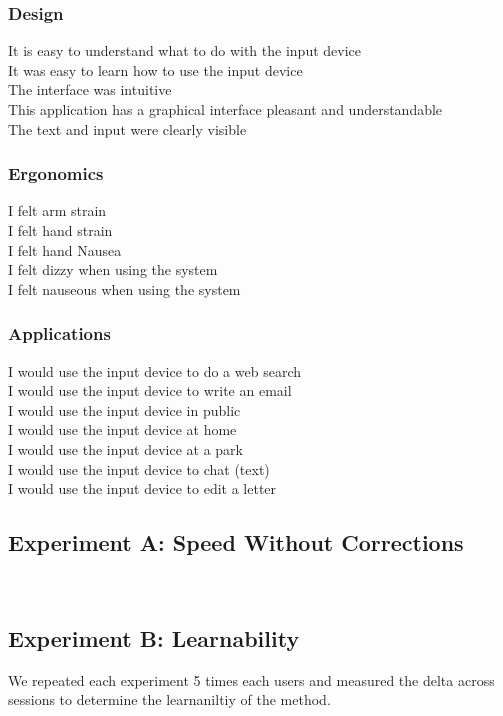 \documentclass{sigchi}
\begin{document}
\subsubsection{Design}
It is easy to understand what to do with the input device\\
It was easy to learn how to use the input device\\
The interface was intuitive\\
This application has a graphical interface pleasant and understandable\\
The text and input were clearly visible

\subsubsection{Ergonomics}
I felt arm strain\\
I felt hand strain\\
I felt hand Nausea\\
I felt dizzy when using the system\\
I felt nauseous when using the system

\subsubsection{Applications}
I would use the input device to do a web search\\
I would use the input device to write an email\\
I would use the input device in public\\
I would use the input device at home\\
I would use the input device at a park\\
I would use the input device to chat (text)\\
I would use the input device to edit a letter

\subsection{Experiment A: Speed Without Corrections}
~\cite{william1995theoretical}

\subsection{Experiment B: Learnability}
We repeated each experiment 5 times each users and measured the delta across sessions to determine the learnaniltiy of the method.
\end{document}
